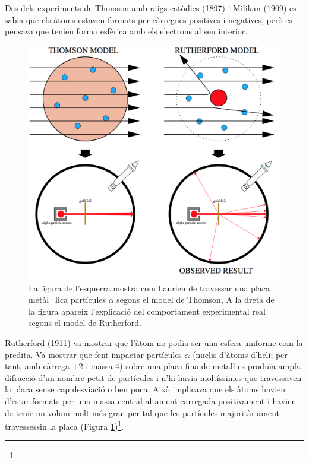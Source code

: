 Des dels experiments de Thomson amb raigs catòdics (1897) i Milikan (1909) es sabia que els àtoms estaven formats per càrregues positives i negatives, però es pensava que tenien forma esfèrica amb els electrons al seu interior.
\begin{figure}[h]
\centering
\includegraphics[scale=0.5]{figures/Rutherford.png}
\caption[Model de Rutherford]{La figura de l'esquerra mostra com haurien de travessar una placa metàl·lica partícules $\alpha$ segons el model de Thomson, A la dreta de la figura apareix l'explicació del comportament experimental real segons el model de Rutherford.}
\label{fig:Rutherford}
\end{figure}
Rutherford (1911) va mostrar que l'àtom no podia ser una esfera uniforme com la predita. Va mostrar que fent impactar partícules $\alpha$ (nuclis d'àtoms d'heli; per tant, amb càrrega +2 i massa 4) sobre una placa fina de metall es produïa ampla difracció d'un nombre petit de partícules i n'hi havia moltíssimes que travessaven la placa sense cap desviació o ben poca. Això implicava que els àtoms havien d'estar formats per una massa central altament carregada positivament i havien de tenir un volum molt més gran per tal que les partícules majoritàriament travessessin la placa (Figura \ref{fig:Rutherford})\footnote{}.

